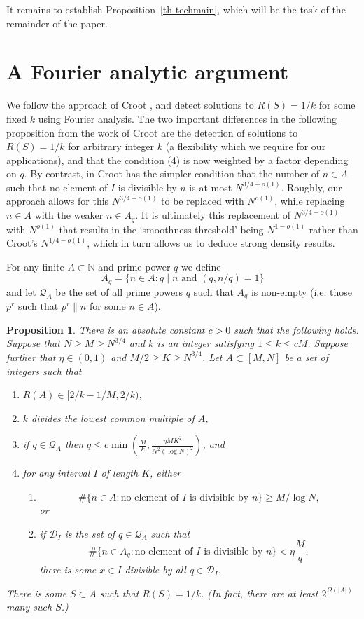 \documentclass[12pt]{amsart}
\newcommand{\bbn}{\mathbb{N}}
\newcommand{\abs}[1]{\left\lvert #1\right\rvert}
\newcommand{\brac}[1]{\left( #1\right)}
\newtheorem{proposition}{Proposition}
\begin{document}
It remains to establish Proposition~\ref{th-techmain}, which will be the task of the remainder of the paper.

\section{A Fourier analytic argument}
We follow the approach of Croot \cite{Cr2003}, and detect solutions to $R(S)=1/k$ for some fixed $k$ using Fourier analysis. The two important differences in the following proposition from the work of Croot are the detection of solutions to $R(S)=1/k$ for arbitrary integer $k$ (a flexibility which we require for our applications), and that the condition (4) is now weighted by a factor depending on $q$. By contrast, in \cite{Cr2003} Croot has the simpler condition that the number of $n\in A$ such that no element of $I$ is divisible by $n$ is at most $N^{3/4-o(1)}$. Roughly, our approach allows for this $N^{3/4-o(1)}$ to be replaced with $N^{o(1)}$, while replacing $n\in A$ with the weaker $n\in A_q$. It is ultimately this replacement of $N^{3/4-o(1)}$ with $N^{o(1)}$ that results in the `smoothness threshold' being $N^{1-o(1)}$ rather than Croot's $N^{1/4-o(1)}$, which in turn allows us to deduce strong density results.

For any finite $A\subset \bbn$ and prime power $q$ we define\label{def-aq}
\[A_q = \{ n\in A : q\mid n\textrm{ and }(q,n/q)=1\}\]
and let $\mathcal{Q}_A$ \label{def-qa} be the set of all prime powers $q$ such that $A_q$ is non-empty (i.e. those $p^r$ such that $p^r\| n$ for some $n\in A$). 

\begin{proposition}\label{prop-fourier}
There is an absolute constant $c>0$ such that the following holds. Suppose that $N\geq M\geq N^{3/4}$ and $k$ is an integer satisfying $1\leq k\leq cM$. Suppose further that $\eta\in(0,1)$ and $M/2\geq K\geq N^{3/4}$. Let $A\subset [M,N]$ be a set of integers such that
\begin{enumerate}
\item $R(A)\in [2/k-1/M,2/k)$,
\item $k$ divides the lowest common multiple of $A$,
\item if $q\in\mathcal{Q}_A$ then $q\leq c\min\brac{\frac{M}{k},\frac{\eta MK^2}{N^2(\log N)^2}}$,  and
\item for any interval $I$ of length $K$, either
\begin{enumerate}
\item \[\# \{ n\in A : \textrm{no element of }I\textrm{ is divisible by }n\}\geq M/\log N,\]
or
\item if $\mathcal{D}_I$ is the set of $q\in\mathcal{Q}_A$ such that
\[\#\{ n\in A_q: \textrm{no element of }I\textrm{ is divisible by }n\}<\eta \frac{M}{q},\]
there is some $x\in I$ divisible by all $q\in\mathcal{D}_I$.
\end{enumerate}
\end{enumerate}
There is some $S\subset A$ such that $R(S)=1/k$. (In fact, there are at least $2^{\Omega(\abs{A})}$ many such $S$.)
\end{proposition}
\end{document}
